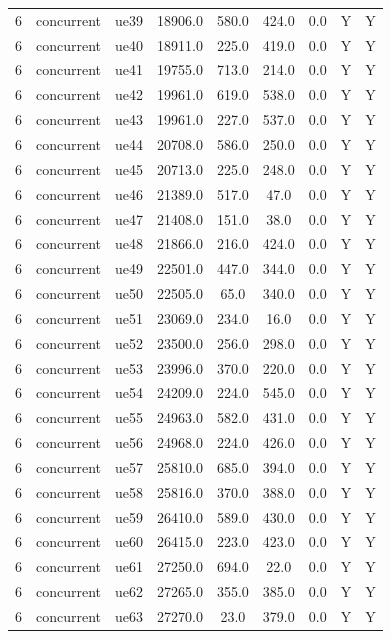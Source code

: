\begin{table}[ht]
\begin{tabular}{|c|c|c|c|c|c|c|c|c|}
6 & concurrent & ue39 & 18906.0 & 580.0 & 424.0 & 0.0 & Y & Y \\
6 & concurrent & ue40 & 18911.0 & 225.0 & 419.0 & 0.0 & Y & Y \\
6 & concurrent & ue41 & 19755.0 & 713.0 & 214.0 & 0.0 & Y & Y \\
6 & concurrent & ue42 & 19961.0 & 619.0 & 538.0 & 0.0 & Y & Y \\
6 & concurrent & ue43 & 19961.0 & 227.0 & 537.0 & 0.0 & Y & Y \\
6 & concurrent & ue44 & 20708.0 & 586.0 & 250.0 & 0.0 & Y & Y \\
6 & concurrent & ue45 & 20713.0 & 225.0 & 248.0 & 0.0 & Y & Y \\
6 & concurrent & ue46 & 21389.0 & 517.0 & 47.0 & 0.0 & Y & Y \\
6 & concurrent & ue47 & 21408.0 & 151.0 & 38.0 & 0.0 & Y & Y \\
6 & concurrent & ue48 & 21866.0 & 216.0 & 424.0 & 0.0 & Y & Y \\
6 & concurrent & ue49 & 22501.0 & 447.0 & 344.0 & 0.0 & Y & Y \\
6 & concurrent & ue50 & 22505.0 & 65.0 & 340.0 & 0.0 & Y & Y \\
6 & concurrent & ue51 & 23069.0 & 234.0 & 16.0 & 0.0 & Y & Y \\
6 & concurrent & ue52 & 23500.0 & 256.0 & 298.0 & 0.0 & Y & Y \\
6 & concurrent & ue53 & 23996.0 & 370.0 & 220.0 & 0.0 & Y & Y \\
6 & concurrent & ue54 & 24209.0 & 224.0 & 545.0 & 0.0 & Y & Y \\
6 & concurrent & ue55 & 24963.0 & 582.0 & 431.0 & 0.0 & Y & Y \\
6 & concurrent & ue56 & 24968.0 & 224.0 & 426.0 & 0.0 & Y & Y \\
6 & concurrent & ue57 & 25810.0 & 685.0 & 394.0 & 0.0 & Y & Y \\
6 & concurrent & ue58 & 25816.0 & 370.0 & 388.0 & 0.0 & Y & Y \\
6 & concurrent & ue59 & 26410.0 & 589.0 & 430.0 & 0.0 & Y & Y \\
6 & concurrent & ue60 & 26415.0 & 223.0 & 423.0 & 0.0 & Y & Y \\
6 & concurrent & ue61 & 27250.0 & 694.0 & 22.0 & 0.0 & Y & Y \\
6 & concurrent & ue62 & 27265.0 & 355.0 & 385.0 & 0.0 & Y & Y \\
6 & concurrent & ue63 & 27270.0 & 23.0 & 379.0 & 0.0 & Y & Y \\

\end{tabular}
\end{table}
